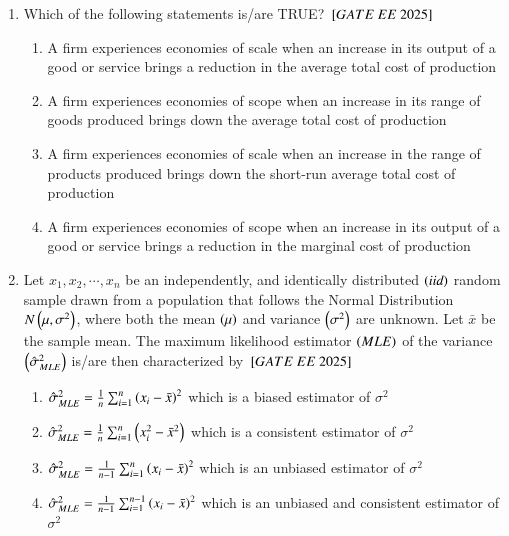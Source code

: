 \documentclass[journal,12pt,onecolumn]{IEEEtran}
\theoremstyle{remark}
\begin{document}
\begin{enumerate}
\item Which of the following statements is/are TRUE?
\hfill $\sbrak{GATE\ EE\ 2025}$
    \begin{enumerate}
     \item A firm experiences economies of scale when an increase in its output of a good or service brings a reduction in the average total cost of production
    \item A firm experiences economies of scope when an increase in its range of goods produced brings down the average total cost of production
    \item A firm experiences economies of scale when an increase in the range of products produced brings down the short-run average total cost of production
    \item A firm experiences economies of scope when an increase in its output of a good or service brings a reduction in the marginal cost of production
   \end{enumerate}
     
    \item Let $x_1, x_2, \cdots, x_n$ be an independently, and identically distributed  $\left(\textit{iid}\right)$ random sample drawn from a population that follows the Normal Distribution $N \left(\mu, \sigma^2\right)$, where both the mean $\left(\mu\right)$ and variance $ \left(\sigma^2\right)$ are unknown. Let $\bar{x}$ be the sample mean. The maximum likelihood estimator  $\left(MLE\right)$ of the variance $\left(\hat{\sigma}^2_{MLE}\right)$ is/are then characterized by
    \hfill $\sbrak{GATE\ EE\ 2025}$
    \begin{enumerate}
    \item $\hat{\sigma}_{MLE}^2 = \frac{1}{n}\sum_{i=1}^{n} \left(x_i-\bar{x}\right)^2$ which is a biased estimator of $\sigma^2$
    \item $\hat{\sigma}_{MLE}^2 = \frac{1}{n}\sum_{i=1}^{n} \left(x_i^2-\bar{x}^2\right)$ which is a consistent estimator of $\sigma^2$
    \item $\hat{\sigma}_{MLE}^2 = \frac{1}{n-1}\sum_{i=1}^{n} \left(x_i-\bar{x}\right)^2$ which is an unbiased estimator of $\sigma^2$
    \item $\hat{\sigma}_{MLE}^2 = \frac{1}{n-1}\sum_{i=1}^{n-1} \left(x_i-\bar{x}\right)^2$ which is an unbiased and consistent estimator of $\sigma^2$
  \end{enumerate}
 

\end{enumerate}
\end{document}
